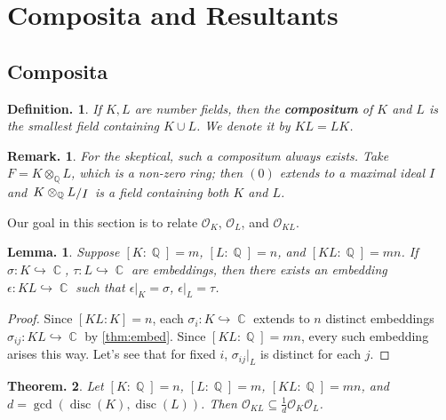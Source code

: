\documentclass[11pt, a4paper]{memoir}
\DeclareMathOperator{\Q}{{\mathbb{Q}}}
\DeclareMathOperator{\C}{{\mathbb{C}}}
\newcommand{\hto}[0]{\ensuremath{\hookrightarrow}}
\theoremstyle{change}
\newtheorem{theorem}{Theorem.}[section]
\newtheorem{lemma}[theorem]{Lemma.}
\theoremstyle{plain}
\theoremstyle{nonumberplain}
\newtheorem{definition}{Definition.}
\newtheorem{remark}{Remark.}
\newtheorem{proof}{Proof}
\DeclareMathOperator{\disc}{disc}
\newcommand{\quot}[2]{\mathchoice{\left.\raisebox{0.14em}{$#1$}\middle/\raisebox{-0.14em}{$#2$}\right.}
                                 {\left.\raisebox{0.08em}{$#1$}\middle/\raisebox{-0.08em}{$#2$}\right.}
                                 {\left.\raisebox{0.03em}{$#1$}\middle/\raisebox{-0.03em}{$#2$}\right.}
                                 {\left.\raisebox{0em}{$#1$}\middle/\raisebox{0em}{$#2$}\right.}}
\numberwithin{equation}{section}
\begin{document}
\section{Composita and Resultants}
\subsection{Composita}
\begin{definition}
    If $K,L$ are number fields, then the \textbf{compositum} of $K$ and $L$ is the smallest field containing $K\cup L$.
    We denote it by $KL=LK$.
\end{definition}
\begin{remark}
    For the skeptical, such a compositum always exists.
    Take $F=K\otimes_{\Q} L$, which is a non-zero ring; then $(0)$ extends to a maximal ideal $I$ and $\quot{K\otimes_{\Q} L}{I}$ is a field containing both $K$ and $L$.
\end{remark}
Our goal in this section is to relate $\mathcal{O}_K$, $\mathcal{O}_L$, and $\mathcal{O}_{KL}$.
\begin{lemma}\label{lem:ext-comp}
    Suppose $[K:\Q]=m$, $[L:\Q]=n$, and $[KL:\Q]=mn$.
    If $\sigma:K\hto\C$, $\tau:L\hto\C$ are embeddings, then there exists an embedding $\epsilon:KL\hto\C$ such that $\epsilon|_K=\sigma$, $\epsilon|_L=\tau$.
\end{lemma}
\begin{proof}
    Since $[KL:K]=n$, each $\sigma_i:K\hto\C$ extends to $n$ distinct embeddings $\sigma_{ij}:KL\hto\C$ by \cref{thm:embed}.
    Since $[KL:\Q]=mn$, every such embedding arises this way.
    Let's see that for fixed $i$, $\sigma_{ij}|_L$ is distinct for each $j$.
\end{proof}
\begin{theorem}\label{thm:comp}
    Let $[K:\Q]=n$, $[L:\Q]=m$, $[KL:\Q]=mn$, and $d=\gcd(\disc(K),\disc(L))$.
    Then $\mathcal{O}_{KL}\subseteq\frac{1}{d}\mathcal{O}_K\mathcal{O}_L$.
\end{theorem}
\end{document}
